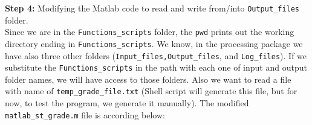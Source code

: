 \noindent
\textbf{Step 4:} Modifying the Matlab code to read and write from/into \texttt{Output\_files} folder.\\
\noindent
Since we are in the \texttt{Functions\_scripts} folder, the \texttt{pwd} prints out the working directory ending in \texttt{Functions\_scripts}. We know, in the processing package we have also three other folders (\texttt{Input\_files,Output\_files}, and \texttt{Log\_files}). If we substitute the  \texttt{Functions\_scripts} in the path with each one of input and output folder names, we will have access to those folders. Also we want to read a file with name of \texttt{temp\_grade\_file.txt} (Shell script will generate this file, but for now, to test the program, we generate it manually). The modified \texttt{matlab\_st\_grade.m} file is according below:

